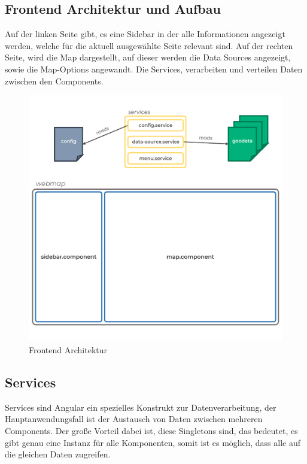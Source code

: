 \subsection{Frontend Architektur und Aufbau}
Auf der linken Seite gibt, es eine Sidebar in der alle Informationen angezeigt werden, welche für die aktuell ausgewählte Seite relevant sind.
Auf der rechten Seite, wird die Map dargestellt, auf dieser werden die Data Sources angezeigt, sowie die Map-Options angewandt.
Die Services, verarbeiten und verteilen Daten zwischen den Components.

\begin{figure}[hbt!]
    \centering
    \includegraphics[scale=.6]{pics/frontend-architecture}
    \caption{Frontend Architektur}
    \label{fig:frontend-architecture}
\end{figure}

\cleardoublepage

\subsection{Services}
Services sind Angular ein spezielles Konstrukt zur Datenverarbeitung, der Hauptanwendungsfall ist der Austausch von Daten
zwischen mehreren Components.
Der große Vorteil dabei ist, diese Singletons sind, das bedeutet, es gibt genau eine Instanz für alle Komponenten, somit
ist es möglich, dass alle auf die gleichen Daten zugreifen.

